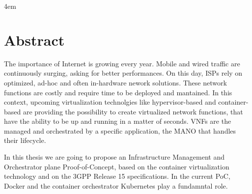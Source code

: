 \cleardoublepage
{}

\thispagestyle{empty}

\vspace*{\fill}
\par
\begingroup
\leftskip4em
\rightskip\leftskip
\section*{\centering Abstract}
The importance of Internet is growing every year. Mobile and wired traffic are
continuously surging, asking for better performances. On this day, ISPs rely on
optimized, ad-hoc and often in-hardware nework solutions. These network
functions are costly and require time to be deployed and mantained. In this
context, upcoming virtualization technolgies like hypervisor-based and
container-based are providing the possibility to create virtualized network
functions, that have the ability to be up and running in a matter of seconds.
VNFs are the managed and orchestrated by a specific application, the MANO that
handles their lifecycle.

In this thesis we are going to propose an Infrastructure Management and
Orchestrator plane Proof-of-Concept, based on the container virtualization
technology and on the 3GPP Release 15 specifications. In the current PoC, Docker
and the container orchestrator Kubernetes play a fundamntal role.
\par
\endgroup
\vspace*{\fill}
